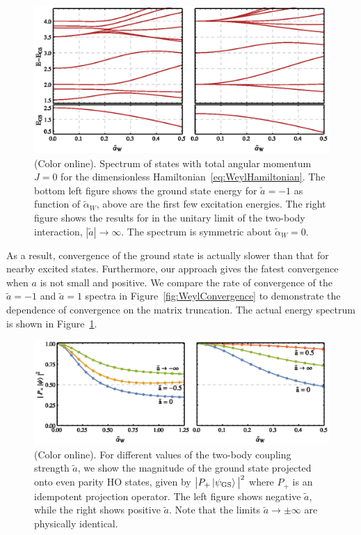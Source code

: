 \documentclass[%
 notitlepage,
 preprint,
showpacs,%
 amsmath,amssymb,
 aps,
pra,
]{revtex4-1}
\begin{document}
\begin{figure}
\includegraphics{Figures/WeylSpectrum}
\caption{\label{fig:WeylSpectrum}(Color online).  Spectrum of states with total angular momentum $J=0$ for the dimensionless Hamiltonian~\eqref{eq:WeylHamiltonian}. The bottom left figure shows the ground state energy for $\tilde{a}=-1$ as function of $\tilde{\alpha}_W$, above are the first few excitation energies. The right figure shows the results for in the unitary limit of the two-body interaction, $|\tilde{a}|\rightarrow\infty$. The spectrum is symmetric about $\tilde{\alpha}_W=0$.} 
\end{figure}


As a result, convergence of the ground state is actually slower than that for nearby excited states. Furthermore, our approach gives the fatest convergence when $a$ is not small and positive. We compare the rate of convergence of the $\tilde{a}=-1$ and $\tilde{a}=1$ spectra in Figure~\ref{fig:WeylConvergence} to demonstrate the dependence of convergence on the matrix truncation. The actual energy spectrum is shown in Figure~\ref{fig:WeylSpectrum}. 

\begin{figure}
\includegraphics{Figures/Projections}
\caption{\label{fig:Projections}(Color online). For different values of the two-body coupling strength $\tilde{a}$, we show the magnitude of the ground state projected onto even parity HO states, given by $\big|  P_+\ket{\psi_{\text{GS}}}\big|^2$ where $P_+$ is an idempotent projection operator. The left figure shows negative $\tilde{a}$, while the right shows positive $\tilde{a}$. Note that the limits $\tilde{a}\rightarrow\pm\infty$ are physically identical.}
\end{figure}
\end{document}
